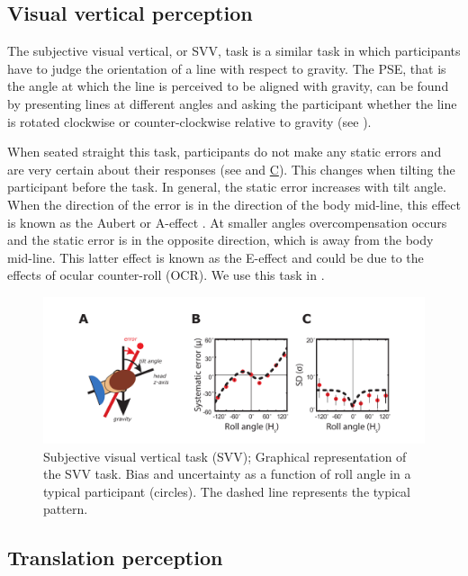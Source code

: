 \subsection{Visual vertical perception}
The subjective visual vertical, or SVV, task is a similar task in which participants have to judge the orientation of a line with respect to gravity. The PSE, that is the angle at which the line is perceived to be aligned with gravity, can be found by presenting lines at different angles and asking the participant whether the line is rotated clockwise or counter-clockwise relative to gravity (see ).

When seated straight this task, participants do not make any static errors and are very certain about their responses (see  and \hyperref[intro:fig5]{C}). This changes when tilting the participant before the task. In general, the static error increases with tilt angle. When the direction of the error is in the direction of the body mid-line, this effect is known as the Aubert or A-effect \cite{aubert1861}. At smaller angles overcompensation occurs and the static error is in the opposite direction, which is away from the body mid-line. This latter effect is known as the E-effect and could be due to the effects of ocular counter-roll (OCR). We use this task in .

\begin{figure}
    \includegraphics[width=1.0\textwidth]{src/intro/figures/svv.pdf}

    \caption{Subjective visual vertical task (SVV);  Graphical representation of the SVV task.  Bias and  uncertainty as a function of roll angle in a typical participant (circles). The dashed line represents the typical pattern.}
    \label{intro:fig5}
\end{figure}

\subsection{Translation perception}

